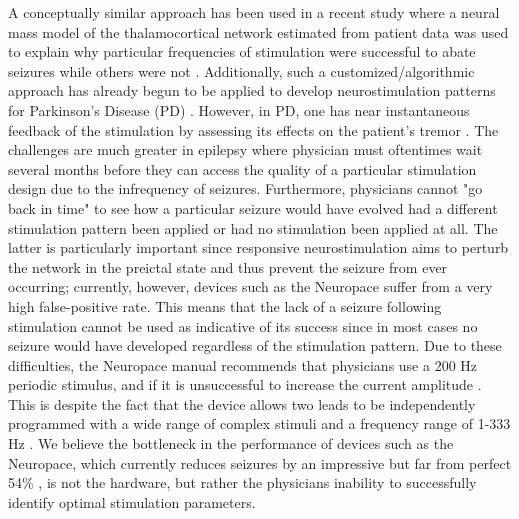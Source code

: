 \documentclass[11pt,a4paper,final]{article}
\begin{document}
A conceptually similar approach has been used in a recent study where a neural mass model of the thalamocortical network estimated from patient data was used to explain why particular frequencies of stimulation were successful to abate seizures while others were not \citep{wendling13}.
Additionally, such a customized/algorithmic approach has already begun to be applied to develop neurostimulation patterns for Parkinson's Disease (PD) \citep{holt14,grill14patent}.
However, in PD, one has near instantaneous feedback of the stimulation by assessing its effects on the patient's tremor \citep{grill13}.
The challenges are much greater in epilepsy where physician must oftentimes wait several months before they can access the quality of a particular stimulation design due to the infrequency of seizures.
Furthermore, physicians cannot "go back in time" to see how a particular seizure would have evolved had a different stimulation pattern been applied or had no stimulation been applied at all.
The latter is particularly important since responsive neurostimulation aims to perturb the network in the preictal state and thus prevent the seizure from ever occurring; currently, however, devices such as the Neuropace suffer from a very high false-positive rate.
This means that the lack of a seizure following stimulation cannot be used as indicative of its success since in most cases no seizure would have developed regardless of the stimulation pattern.
Due to these difficulties, the Neuropace manual recommends that physicians use a 200 Hz periodic stimulus, and if it is unsuccessful to increase the current amplitude \citep{NP}.
This is despite the fact that the device allows two leads to be independently programmed with a wide range of complex stimuli and a frequency range of 1-333 Hz \citep{sun08}.
We believe the bottleneck in the performance of devices such as the Neuropace, which currently reduces seizures by an impressive but far from perfect 54\% \citep{heck14}, is not the hardware, but rather the physicians inability to successfully identify optimal stimulation parameters.
\end{document}
